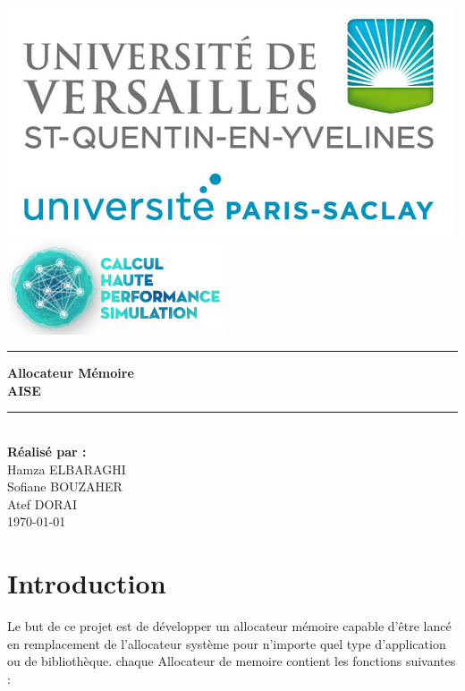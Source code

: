 \documentclass[12pt,a4paper]{article}
\begin{document}

\begin{titlepage}
\newcommand{\HRule}{\rule{\linewidth}{0.1mm}}
\center

\includegraphics[scale=0.4]{logo.png} \\[0.2cm]
\includegraphics[scale=0.7]{CHPS_logo.png} \\[1.5cm]

\HRule 
{ \huge \bfseries Allocateur Mémoire \\ AISE
  \\[0.15cm] }
\HRule \\[1.5cm]

\textbf{Réalisé par :} \\ Hamza ELBARAGHI \\ Sofiane BOUZAHER \\ Atef DORAI 
\\[1cm]
\today \\ [1cm]
\end{titlepage}



\renewcommand*\contentsname{Sommaire}
\tableofcontents

\pagebreak


\section{Introduction}
Le but de ce projet est de développer un allocateur mémoire capable d'être lancé en
remplacement de l’allocateur système pour n’importe quel type d’application ou de
bibliothèque. chaque Allocateur de memoire contient les fonctions suivantes :
\end{document}
